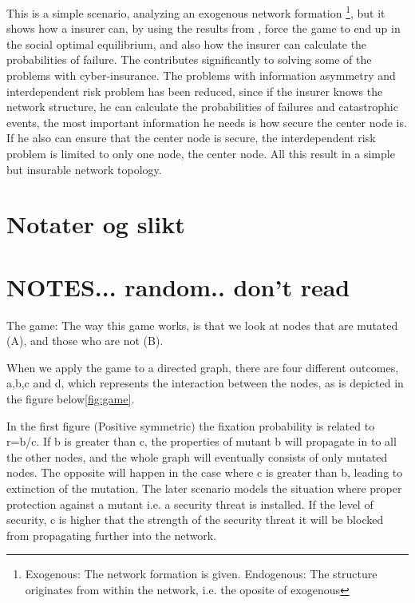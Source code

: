 This is a simple scenario, analyzing an exogenous network formation \footnote{Exogenous: The network formation is given. Endogenous: The structure originates from within the network, i.e. the oposite of exogenous}, 
but it shows how a insurer can, by using the results from \cite{lieberman2005evolutionary}, force the game to end up in the social optimal equilibrium, and also how the insurer can calculate the probabilities of failure. 
The contributes significantly to solving some of the problems with cyber-insurance. The problems with information asymmetry and interdependent risk problem has been reduced, since if the insurer knows the network structure, he can calculate the probabilities of failures and catastrophic events, the most important information he needs is how secure the center node is. If he also can ensure that the center node is secure, the interdependent risk problem is limited to only one node, the center node. All this result in a simple but insurable network topology.

   
\section{Notater og slikt}

\section{NOTES... random.. don't read}
 
The game:
The way this game works, is that we look at nodes that are mutated (A), and those who are not (B).  

When we apply the game to a directed graph, there are four different outcomes, a,b,c and d, which represents the interaction between the nodes, as is depicted in the figure below\ref{fig:game}. 

In the first figure (Positive symmetric) the fixation probability is related to r=b/c. If b is greater than c, the properties of mutant b will propagate in to all the other nodes, and the whole graph will eventually consists of only mutated nodes. The opposite will happen in the case where c is greater than b, leading to extinction of the mutation. The later scenario models the situation where proper protection against a mutant i.e. a security threat is installed. If the level of security, c is higher that the strength of the security threat it will be blocked from propagating further into the network. 


